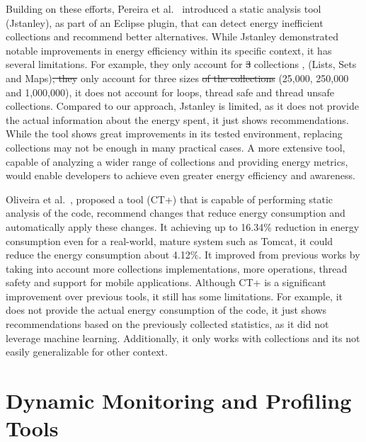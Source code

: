 Building on these efforts, Pereira et al.~\cite{10.1145/3238147.3240473} introduced a static analysis tool (Jstanley), as part of an Eclipse plugin, that can detect energy inefficient collections and recommend better alternatives. While Jstanley demonstrated notable improvements in energy efficiency within its specific context, it has several limitations.
For example, they only account for \st{3}  collections , (Lists, Sets and Maps)\st{, they}  only account for three  sizes \st{of the collections} (25,000, 250,000 and 1,000,000), it does not account for loops, thread safe and thread unsafe collections. Compared to our approach, Jstanley is limited, as it does not provide the actual information about the energy spent, it just shows recommendations. While the tool shows great improvements in its tested environment, replacing collections may not be enough in many practical cases. A more extensive tool, capable of analyzing a wider range of collections and providing energy metrics, would enable developers to achieve even greater energy efficiency and awareness.

Oliveira et al.~\cite{8816747}, proposed a tool (CT+) that is capable of performing static analysis of the code, recommend changes that reduce energy consumption and automatically apply these changes. It achieving up to 16.34\% reduction in energy consumption even for a real-world, mature system such as Tomcat, it could reduce the energy consumption about 4.12\%. It improved from previous works by taking into account more collections implementations, more operations, thread safety and support for mobile applications. Although CT+ is a significant improvement over previous tools, it still has some limitations. For example, it does not provide the actual energy consumption of the code, it just shows recommendations based on the previously collected statistics, as it did not leverage machine learning. Additionally, it only works with collections and its not easily generalizable for other context. 


\section{Dynamic Monitoring and Profiling Tools}

